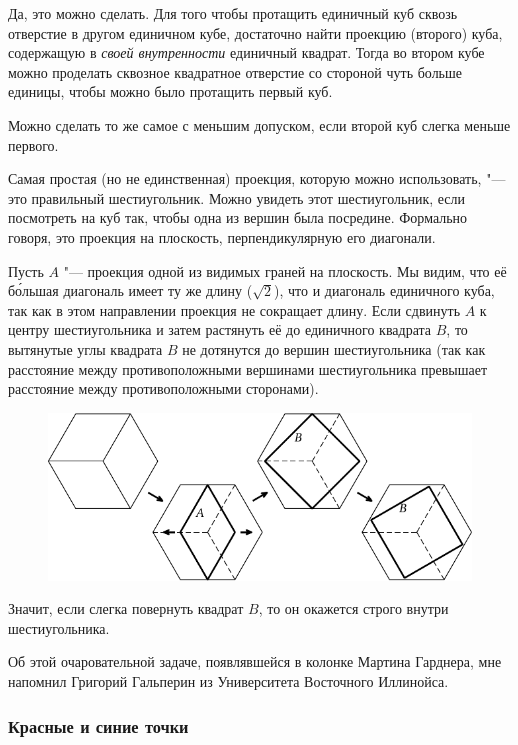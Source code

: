 \documentclass[twoside]{book}
\begin{document}
Да, это можно сделать.
Для того чтобы протащить единичный куб сквозь отверстие в другом единичном кубе, достаточно найти проекцию (второго) куба, содержащую в \emph{своей внутренности} единичный квадрат.
Тогда во втором кубе можно проделать сквозное квадратное отверстие %
со стороной чуть больше единицы, чтобы можно было протащить первый куб.

Можно сделать то же самое с меньшим допуском, если второй куб слегка меньше первого.

Самая простая (но не единственная) проекция, которую можно использовать, "--- это правильный шестиугольник.
Можно увидеть этот шестиугольник, если посмотреть на куб так, чтобы одна из вершин была посредине.
Формально говоря, это проекция на плоскость, перпендикулярную его диагонали. %

Пусть $A$ "--- проекция одной из видимых граней на плоскость.
Мы видим, что её б\'{о}льшая диагональ имеет ту же длину ($\sqrt{2}$), что и диагональ единичного куба, так как в этом направлении проекция не сокращает длину.
Если сдвинуть $A$ к центру шестиугольника и затем растянуть её до единичного квадрата $B$, то вытянутые углы квадрата $B$ не дотянутся до вершин шестиугольника (так как расстояние между противоположными вершинами шестиугольника превышает расстояние между противоположными сторонами).

\begin{figure}[!ht]
\centering
\includegraphics{mp/wink-11}
\end{figure}

Значит, если слегка повернуть квадрат $B$, то он окажется строго внутри шестиугольника.\heart

Об этой очаровательной задаче, появлявшейся в колонке Мартина Гарднера, мне напомнил Григорий Гальперин из Университета Восточного Иллинойса.

\subsubsection*{Красные и синие точки}%
\end{document}
